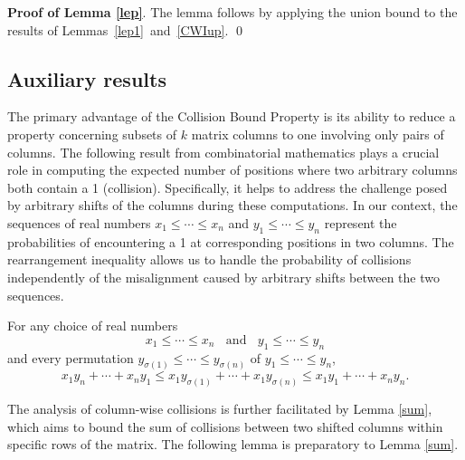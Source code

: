 \documentclass[11pt]{article}
\begin{document}
\medskip
\noindent
\textbf{Proof of Lemma \ref{lep}}.
The lemma follows by applying the union bound to the results of Lemmas~\ref{lep1}~and~\ref{CWIup}. 
\qed





\subsection{Auxiliary results}
\label{prel}

The primary advantage of the Collision Bound Property is its ability to reduce 
a property concerning subsets of $k$ matrix columns to one involving only pairs of columns. 
The following result from combinatorial mathematics plays a crucial role in 
computing the expected number of positions where two arbitrary columns both contain a 1 (collision). 
Specifically, it helps to address the challenge posed by arbitrary shifts of the columns during 
these computations. In our context, the sequences of real numbers 
$x_1 \le \cdots \le x_n$ and $y_1 \le \cdots \le y_n$ represent the probabilities of encountering 
a 1 at corresponding positions in two columns. The rearrangement inequality allows us to handle 
the probability of collisions independently of the misalignment caused by arbitrary shifts between 
the two sequences.


\begin{theorem}\label{th:hardy}
	For any choice of real numbers
	\[
	x_1 \le \cdots \le x_n \;\;\text{ and }\;\;  y_1 \le \cdots \le y_n
	\]
	and every permutation $y_{\sigma(1)} \le \cdots \le y_{\sigma(n)}$ 
	of $y_1 \le \cdots \le y_n$,
	\begin{equation}\label{rearrange}
	x_1 y_n + \cdots + x_n y_1 
	\le x_1 y_{\sigma(1)} + \cdots + x_1 y_{\sigma(n)} 
	\le x_1 y_1 + \cdots + x_n y_n.	    
	\end{equation}
\end{theorem}

The analysis of column-wise collisions is further facilitated by Lemma \ref{sum}, 
which aims to bound the sum of collisions between two shifted columns within specific rows 
of the matrix. 
The following lemma is preparatory to Lemma \ref{sum}.
\end{document}
